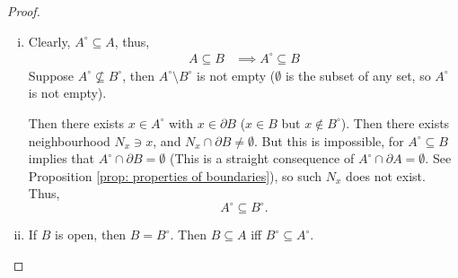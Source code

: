 \begin{proposition}
\begin{proof}
\begin{enumerate}[(i)]
			\item
			Clearly, $A^\circ \subseteq A$, thus,
			$$
			\begin{aligned}
				A \subseteq B &\implies A^\circ \subseteq B
			\end{aligned}
			$$
			Suppose $A^\circ \not \subseteq B^\circ$, then $A^\circ \setminus B^\circ$ is not empty ($\emptyset$ is the subset of any set, so $A^\circ$ is not empty). 
			
			Then there exists $x \in A^\circ$ with $x \in \partial B$ ($x \in B$ but $x\notin B^\circ$). Then there exists neighbourhood $N_x \ni x$, and $N_x \cap \partial B \ne \emptyset.$ But this is impossible, for $A^\circ \subseteq B$ implies that $A^\circ \cap \partial B = \emptyset$ (This is a straight consequence of $A^\circ \cap \partial A = \emptyset$. See Proposition \ref{prop: properties of boundaries}), so such $N_x$ does not exist. Thus,
			$$
			A^\circ \subseteq B^\circ.
			$$
			
			\item
			If $B$ is open, then $B = B^\circ$. Then $B \subseteq A$ iff $B^\circ \subseteq A^\circ$.
 		\end{enumerate}
	\end{proof}
\end{proposition}



